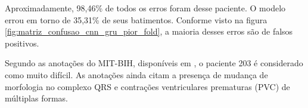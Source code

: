 Aproximadamente, 98,46\% de todos os erros foram desse paciente. O modelo errou em torno de 35,31\% de seus batimentos. Conforme visto na 
figura \ref{fig:matriz_confusao_cnn_gru_pior_fold}, a maioria desses erros são de falsos positivos.

Segundo as anotações do MIT-BIH, disponíveis em \cite{physionet_annotations}, o paciente 203 é considerado como muito difícil. As anotações ainda citam
a presença de mudança de morfologia no complexo QRS e contrações ventriculares prematuras (PVC) de múltiplas formas.